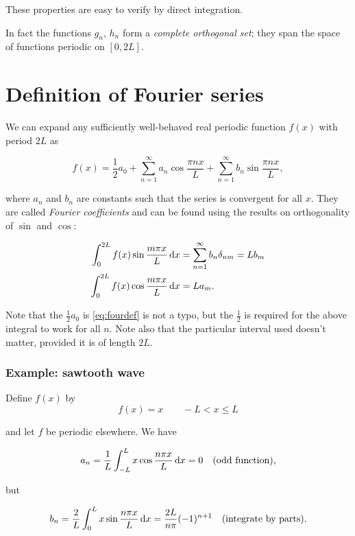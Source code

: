 \documentclass{notes}
\theoremstyle{plain}
\begin{document}
These properties are easy to verify by direct integration.

In fact the functions $g_n$, $h_n$ form a \emph{complete orthogonal
  set}; they span the space of functions periodic on $[0,2L]$.

\section{Definition of Fourier series}

We can expand any sufficiently well-behaved real periodic function
$f(x)$ with period $2L$ as

\begin{equation}\label{eq:fourdef}
f(x) = \frac{1}{2} a_0 + \sum_{n=1}^\infty a_n \cos \frac{\pi n x}{L}
+ \sum_{n=1}^\infty b_n \sin \frac{\pi n x}{L},
\end{equation}

where $a_n$ and $b_n$ are constants such that the series is convergent
for all $x$.  They are called \emph{Fourier coefficients} and can be
found using the results on orthogonality of $\sin$ and $\cos$:

\begin{align*}
\int_0^{2L} f(x) \sin \frac{m \pi x}{L}\, \mathrm{d} x &= \sum_{n=1}^\infty
b_n \delta_{nm} = L b_m \\
\int_0^{2L} f(x) \cos \frac{m \pi x}{L}\, \mathrm{d} x &= L a_m.
\end{align*}

Note that the $\frac{1}{2} a_0$ is \eqref{eq:fourdef} is not a typo,
but the $\frac{1}{2}$ is required for the above integral to work for
all $n$.  Note also that the particular interval used doesn't matter,
provided it is of length $2L$.

\subsubsection*{Example: sawtooth wave}\label{ref:sawtooth}

Define $f(x)$ by
\[
f(x) = x \qquad -L < x \le L
\] 

and let $f$ be periodic elsewhere.  We have

\[
a_n = \frac{1}{L} \int_{-L}^L x \cos \frac{n \pi x}{L}\, \mathrm{d} x = 0
\quad \text{(odd function)},
\]

but

\[
b_n = \frac{2}{L} \int_0^L x \sin \frac{n \pi x}{L}\, \mathrm{d} x
= \frac{2 L}{n \pi} (-1)^{n+1} \quad \text{(integrate by parts).} 
\]
\end{document}
